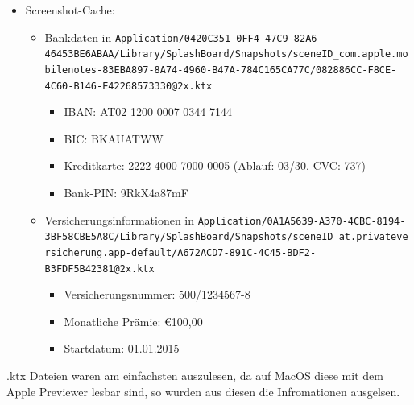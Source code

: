 \documentclass[12pt,a4paper,titlepage,oneside]{scrartcl}
\begin{document}
\begin{itemize}
\item Screenshot-Cache:
  \begin{itemize}
  \item Bankdaten in \lstinline{Application/0420C351-0FF4-47C9-82A6-46453BE6ABAA/Library/SplashBoard/Snapshots/sceneID_com.apple.mobilenotes-83EBA897-8A74-4960-B47A-784C165CA77C/082886CC-F8CE-4C60-B146-E42268573330@2x.ktx}
    \begin{itemize}
    \item IBAN: AT02 1200 0007 0344 7144
    \item BIC: BKAUATWW
    \item Kreditkarte: 2222 4000 7000 0005 (Ablauf: 03/30, CVC: 737)
    \item Bank-PIN: 9RkX4a87mF
    \end{itemize}
  \item Versicherungsinformationen in \lstinline{Application/0A1A5639-A370-4CBC-8194-3BF58CBE5A8C/Library/SplashBoard/Snapshots/sceneID_at.privateversicherung.app-default/A672ACD7-891C-4C45-BDF2-B3FDF5B42381@2x.ktx}
    \begin{itemize}
    \item Versicherungsnummer: 500/1234567-8
    \item Monatliche Prämie: €100,00
    \item Startdatum: 01.01.2015
    \end{itemize}
  \end{itemize}
\end{itemize}

.ktx Dateien waren am einfachsten auszulesen, da auf MacOS diese mit dem Apple Previewer lesbar sind, so wurden aus diesen die Infromationen ausgelsen.
\end{document}
